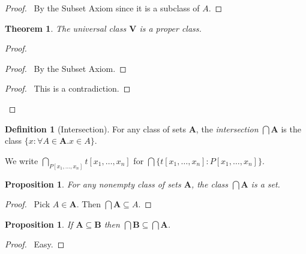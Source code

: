 \documentclass{article}
\let\qed\relax
\newtheorem{proposition}[axiom]{Proposition}
\newtheorem{theorem}[axiom]{Theorem}
\theoremstyle{definition}
\newtheorem{definition}[axiom]{Definition}
\begin{document}
    \begin{proof}
        \pf\ By the Subset Axiom since it is a subclass of $A$. \qed
    \end{proof}

    \begin{theorem}
        The universal class $\mathbf{V}$ is a proper class.
    \end{theorem}

    \begin{proof}
        \pf
        \begin{proof}
            \pf\ By the Subset Axiom.
        \end{proof}
        \qedstep
        \begin{proof}
            \pf\ This is a contradiction.
        \end{proof}
        \qed
    \end{proof}
    
    \begin{definition}[Intersection]
        For any class of sets $\mathbf{A}$, the \emph{intersection} $\bigcap \mathbf{A}$ is the class
        $\{ x : \forall A \in \mathbf{A}. x \in A \}$.

        We write $\bigcap_{P[x_1, \ldots, x_n]} t[x_1, \ldots, x_n]$ for $\bigcap \{ t[x_1, \ldots, x_n]
        : P[x_1, \ldots, x_n] \}$.
    \end{definition}

    \begin{proposition}
        For any nonempty class of sets $\mathbf{A}$, the class $\bigcap \mathbf{A}$ is a set.
    \end{proposition}

    \begin{proof}
        \pf\ Pick $A \in \mathbf{A}$. Then $\bigcap \mathbf{A} \subseteq A$. \qed
    \end{proof}
    
    \begin{proposition}
        If $\mathbf{A} \subseteq \mathbf{B}$ then $\bigcap \mathbf{B} \subseteq \bigcap \mathbf{A}$.
    \end{proposition}

    \begin{proof}
        \pf\ Easy. \qed
    \end{proof}
\end{document}
